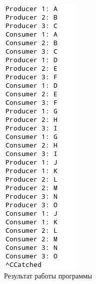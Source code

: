 \documentclass[14pt, a4paper]{extarticle}
\begin{document}
\begin{figure}[h!]
	\centering
	\includegraphics[scale=1]{source/1.png}
	\caption{Результат работы программы}
	\label{Example1}
\end{figure}\par

\newpage
\end{document}
